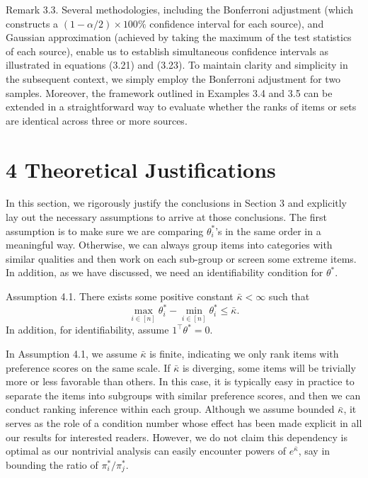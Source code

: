 Remark 3.3. Several methodologies, including the Bonferroni adjustment (which constructs a \((1 - \alpha /2)\times 100\%\) confidence interval for each source), and Gaussian approximation (achieved by taking the maximum of the test statistics of each source), enable us to establish simultaneous confidence intervals as illustrated in equations (3.21) and (3.23). To maintain clarity and simplicity in the subsequent context, we simply employ the Bonferroni adjustment for two samples. Moreover, the framework outlined in Examples 3.4 and 3.5 can be extended in a straightforward way to evaluate whether the ranks of items or sets are identical across three or more sources.

\section{4 Theoretical Justifications}\label{theoretical-justifications}

In this section, we rigorously justify the conclusions in Section 3 and explicitly lay out the necessary assumptions to arrive at those conclusions. The first assumption is to make sure we are comparing \(\theta_{i}^{*}\)'s in the same order in a meaningful way. Otherwise, we can always group items into categories with similar qualities and then work on each sub-group or screen some extreme items. In addition, as we have discussed, we need an identifiability condition for \(\theta^{*}\).

Assumption 4.1. There exists some positive constant \(\bar{\kappa} < \infty\) such that
\[
\max_{i\in [n]}\theta_{i}^{*} - \min_{i\in [n]}\theta_{i}^{*}\leq \bar{\kappa}.
\]
In addition, for identifiability, assume \(1^{\top}\theta^{*} = 0\).

In Assumption 4.1, we assume \(\bar{\kappa}\) is finite, indicating we only rank items with preference scores on the same scale. If \(\bar{\kappa}\) is diverging, some items will be trivially more or less favorable than others. In this case, it is typically easy in practice to separate the items into subgroups with similar preference scores, and then we can conduct ranking inference within each group. Although we assume bounded \(\bar{\kappa}\), it serves as the role of a condition number whose effect has been made explicit in all our results for interested readers. However, we do not claim this dependency is optimal as our nontrivial analysis can easily encounter powers of \(e^{\bar{\kappa}}\), say in bounding the ratio of \(\pi_{i}^{*} / \pi_{j}^{*}\).

